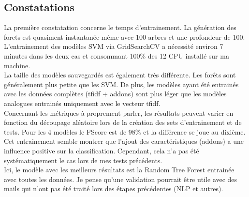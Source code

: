 \subsection*{Constatations}
    La première constatation concerne le temps d'entrainement.
    La génération des forets est quasiment instantanée même avec 100 arbres et une profondeur de 100.
    L'entrainement des modèles SVM via GridSearchCV a nécessité environ 7 minutes dans les deux cas et consommant 100\% des 12 CPU installé sur ma machine.\\

    La taille des modèles sauvegardés est également très différente.
    Les forêts sont généralement plus petite que les SVM\@.
    De plus, les modèles ayant été entrainés avec les données complètes (tfidf + addons) sont plus léger que les modèles analogues entrainés uniquement avec le vecteur tfidf.\\

    Concernant les métriques à proprement parler, les résultats peuvent varier en fonction du découpage aléatoire lors de la création des sets d'entrainement et de tests.
    Pour les 4 modèles le FScore est de 98\% et la différence se joue au dixième.
    Cet entrainement semble montrer que l'ajout des caractéristiques (addons) a une influence positive sur la classification.
    Cependant, cela n'a pas été systématiquement le cas lors de mes tests précédents.\\

    Ici, le modèle avec les meilleurs résultats est la Random Tree Forest entrainée avec toutes les données.
    Je pense qu'une validation pourrait être utile avec des mails qui n'ont pas été traité lors des étapes précédentes (NLP et autres).
